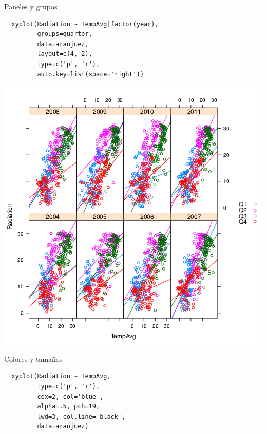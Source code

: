\documentclass[xcolor={usenames,svgnames,dvipsnames}]{beamer}
\begin{document}
\begin{frame}[fragile,label=sec-3-16]{Paneles y grupos}
 \lstset{language=R,label= ,caption= ,numbers=none}
\begin{lstlisting}
  xyplot(Radiation ~ TempAvg|factor(year),
         groups=quarter,
         data=aranjuez,
         layout=c(4, 2),
         type=c('p', 'r'),
         auto.key=list(space='right'))
\end{lstlisting}
\end{frame}

\begin{frame}[label=sec-3-17]{}
\includegraphics[width=.9\linewidth]{figs/xyplotQuarterYearSmooth.png}
\end{frame}

\begin{frame}[fragile,label=sec-3-18]{Colores y tamaños}
 \lstset{language=R,label= ,caption= ,numbers=none}
\begin{lstlisting}
  xyplot(Radiation ~ TempAvg,
         type=c('p', 'r'),
         cex=2, col='blue',
         alpha=.5, pch=19,
         lwd=3, col.line='black',
         data=aranjuez)
\end{lstlisting}
\end{frame}
\end{document}
